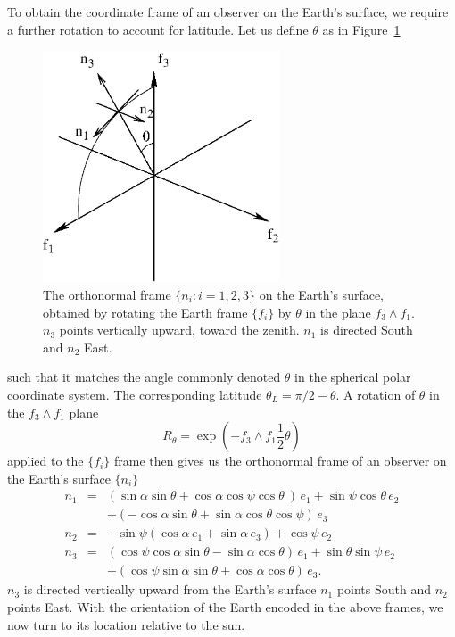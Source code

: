 \documentclass[12pt]{article}
\newcommand{\nn}{\nonumber}
\newcommand{\wdg}{\! \wedge \!}
\newcommand{\half}{{\textstyle \frac{1}{2}}}
\begin{document}
To obtain the coordinate frame of an observer on the Earth's surface, we require a further rotation to account for latitude. Let us define $\theta$ as in Figure~\ref{fig:nframe}
%
\begin{figure}
\centering
\includegraphics[width=7cm]{figs/figure2.eps}
\caption{The orthonormal frame $\{n_i : i = 1,2,3\}$ on the Earth's surface, obtained by rotating the Earth frame $\{f_i\}$ by $\theta$ in the plane $f_3 \wdg f_1$. $n_3$ points vertically upward, toward the zenith. $n_1$ is directed South and $n_2$ East.\label{fig:nframe}}
\end{figure}
%
such that it matches the angle commonly denoted $\theta$ in the spherical polar coordinate system. The corresponding latitude $\theta_L = \pi/2 - \theta$. A rotation of $\theta$ in the $f_3 \wdg f_1$ plane
%
\begin{equation}
R_\theta = \exp(-f_3 \wdg f_1\half\theta)
\end{equation}
%
applied to the $\{f_i\}$ frame then gives us the orthonormal frame of an observer on the Earth's surface $\{n_i\}$
%
\begin{eqnarray} \label{nFrame}
n_1 & = & \left( \sin\alpha\sin\theta+\cos\alpha\cos\psi\cos\theta\ \right) \, e_1
		+ \sin\psi\cos\theta\,e_2 \\ \nn
	& & + \left( -\cos\alpha\sin\theta+\sin\alpha\cos\theta\cos\psi \right) \, e_3 \\ \nn
n_2 & = & - \sin\psi( \cos\alpha \,e_1 + \sin\alpha \,e_3 ) + \cos\psi \,e_2 \\ \nn
n_3 & = & \left( \cos\psi\cos\alpha\sin\theta-\sin\alpha\cos\theta \right) \, e_1
+ \sin\theta\sin\psi \, e_2 \\ \nn
	& & + \left( \cos\psi\sin\alpha\sin\theta+\cos\alpha\cos\theta \right) \, e_3.
\end{eqnarray}
%
$n_3$ is directed vertically upward from the Earth's surface $n_1$ points South and $n_2$ points East. With the orientation of the Earth encoded in the above frames, we now turn to its location relative to the sun.
%
\end{document}
